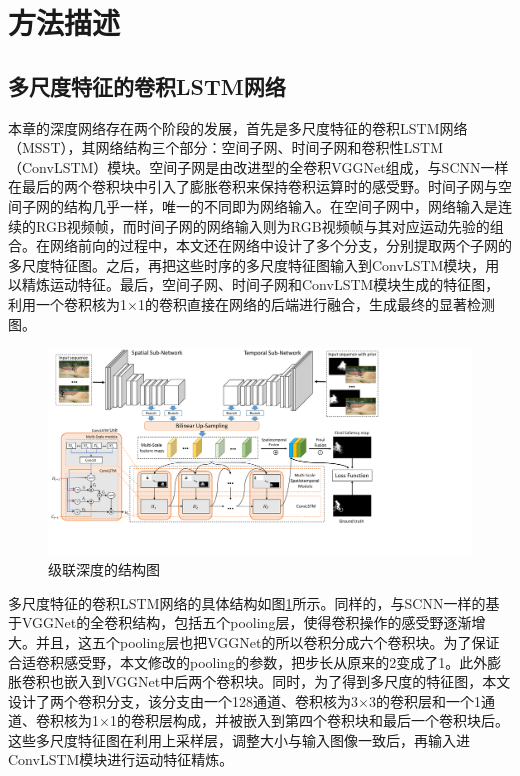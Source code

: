 \section{方法描述}
\subsection{多尺度特征的卷积LSTM网络}
本章的深度网络存在两个阶段的发展，首先是多尺度特征的卷积LSTM网络（MSST），其网络结构三个部分：空间子网、时间子网和卷积性LSTM（ConvLSTM）模块。空间子网是由改进型的全卷积VGGNet组成，与SCNN一样在最后的两个卷积块中引入了膨胀卷积来保持卷积运算时的感受野。时间子网与空间子网的结构几乎一样，唯一的不同即为网络输入。在空间子网中，网络输入是连续的RGB视频帧，而时间子网的网络输入则为RGB视频帧与其对应运动先验的组合。在网络前向的过程中，本文还在网络中设计了多个分支，分别提取两个子网的多尺度特征图。之后，再把这些时序的多尺度特征图输入到ConvLSTM模块，用以精炼运动特征。最后，空间子网、时间子网和ConvLSTM模块生成的特征图，利用一个卷积核为1$\times$1的卷积直接在网络的后端进行融合，生成最终的显著检测图。

\begin{figure}
\includegraphics[width=15cm]{figures/msst_framework}
\caption{级联深度的结构图}
\label{msst}
\end{figure}

多尺度特征的卷积LSTM网络的具体结构如图\ref{msst}所示。同样的，与SCNN一样的基于VGGNet的全卷积结构，包括五个pooling层，使得卷积操作的感受野逐渐增大。并且，这五个pooling层也把VGGNet的所以卷积分成六个卷积块。为了保证合适卷积感受野，本文修改的pooling的参数，把步长从原来的2变成了1。此外膨胀卷积也嵌入到VGGNet中后两个卷积块。同时，为了得到多尺度的特征图，本文设计了两个卷积分支，该分支由一个128通道、卷积核为3$\times$3的卷积层和一个1通道、卷积核为1$\times$1的卷积层构成，并被嵌入到第四个卷积块和最后一个卷积块后。这些多尺度特征图在利用上采样层，调整大小与输入图像一致后，再输入进ConvLSTM模块进行运动特征精炼。

